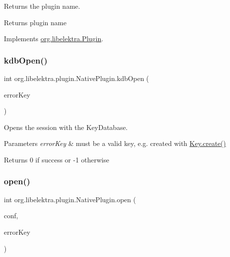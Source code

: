 Returns the plugin name. 

\begin{DoxyReturn}{Returns}
plugin name 
\end{DoxyReturn}


Implements \hyperlink{interfaceorg_1_1libelektra_1_1Plugin_a51be1d6efdd3542c2ae503031bd16e04}{org.\+libelektra.\+Plugin}.

\mbox{\label{classorg_1_1libelektra_1_1plugin_1_1NativePlugin_a232c37208b79734c6be8a9f426efa56a}} 
\subsubsection{\texorpdfstring{kdb\+Open()}{kdbOpen()}}
{\footnotesize\ttfamily int org.\+libelektra.\+plugin.\+Native\+Plugin.\+kdb\+Open (\begin{DoxyParamCaption}\item[{\hyperlink{classorg_1_1libelektra_1_1Key}{Key}}]{error\+Key }\end{DoxyParamCaption})\hspace{0.3cm}{\ttfamily [inline]}}



Opens the session with the Key\+Database. 


\begin{DoxyParams}{Parameters}
{\em error\+Key} & must be a valid key, e.\+g. created with \hyperlink{classorg_1_1libelektra_1_1Key_af407cf43625618af4e7fb2576037fcfc}{Key.\+create()} \\
\hline
\end{DoxyParams}
\begin{DoxyReturn}{Returns}
0 if success or -\/1 otherwise 
\end{DoxyReturn}
\mbox{\label{classorg_1_1libelektra_1_1plugin_1_1NativePlugin_a81510de92e0d65784e877bf53b89756a}} 
\subsubsection{\texorpdfstring{open()}{open()}}
{\footnotesize\ttfamily int org.\+libelektra.\+plugin.\+Native\+Plugin.\+open (\begin{DoxyParamCaption}\item[{\hyperlink{classorg_1_1libelektra_1_1KeySet}{Key\+Set}}]{conf,  }\item[{\hyperlink{classorg_1_1libelektra_1_1Key}{Key}}]{error\+Key }\end{DoxyParamCaption})\hspace{0.3cm}{\ttfamily [inline]}}



